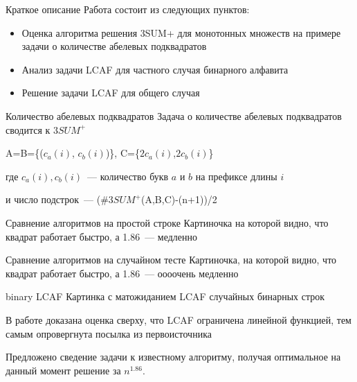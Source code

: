 \documentclass[hyperref=unicode,graphics=pdflatex,12pt]{beamer}
\begin{document}
\begin{frame}{Краткое описание}
\hspace{0.5cm}
Работа состоит из следующих пунктов:
\begin{itemize}
\item<2-> Оценка алгоритма решения 3SUM+ для монотонных множеств на примере задачи о количестве абелевых подквадратов
\item<3-> Анализ задачи LCAF для частного случая бинарного алфавита
\item<4-> Решение задачи LCAF для общего случая
\end{itemize}
\end{frame}

\begin{frame}{Количество абелевых подквадратов}
Задача о количестве абелевых подквадратов сводится к $3SUM^+$
\vspace{0.5cm}

 A=B=\{($c_a(i)$, $c_b(i)$)\}, C=\{$2c_a(i)$,$2c_b(i)$\}
\vspace{0.5cm}

где $c_a(i), c_b(i)$~--- количество букв $a$ и $b$ на префиксе длины $i$
\vspace{0.5cm}

 и число подстрок~--- (\#3$SUM^+$(A,B,C)-(n+1))/2

\end{frame}

\begin{frame}{Сравнение алгоритмов на простой строке}
Картиночка на которой видно, что квадрат работает быстро, а 1.86~--- медленно
\end{frame}

\begin{frame}{Сравнение алгоритмов на случайном тесте}
Картиночка, на которой видно, что квадрат работает быстро, а 1.86~--- оооочень медленно
\end{frame}

\begin{frame}{binary LCAF}
Картинка с матожиданием LCAF случайных бинарных строк

\vspace{0.5cm}
В работе доказана оценка сверху, что LCAF ограничена линейной функцией, тем самым опровергнута посылка из первоисточника

\vspace{0.5cm}
Предложено сведение задачи к известному алгоритму, получая оптимальное на данный момент решение за $n^{1.86}$.
\end{frame}
\end{document}
